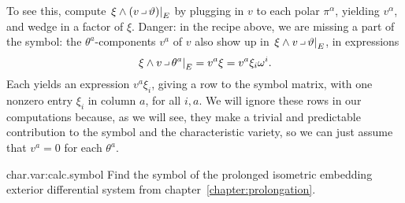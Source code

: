 To see this, compute \(\left.\xi\wedge(v\hook\vartheta)\right|_E\) by plugging in \(v\) to each polar \(\pi^{\alpha}\), yielding \(v^{\alpha}\), and wedge in a factor of \(\xi\).
Danger: in the recipe above, we are missing a part of the symbol: the \(\theta^a\)-components \(v^a\) of \(v\) also show up in \(\left.\xi\wedge v\hook\vartheta\right|_E\), in expressions 
\[
\left.\xi\wedge v\hook\theta^a\right|_E=v^a\xi=v^a\xi_i\omega^i.
\]
Each yields an expression \(v^a\xi_i\), giving a row to the symbol matrix, with one nonzero entry \(\xi_i\) in column \(a\), for all \(i,a\).
We will ignore these rows in our computations because, as we will see, they make a trivial and predictable contribution to the symbol and the characteristic variety, so we can just assume that \(v^a=0\) for each \(\theta^a\).
\begin{problem}{char.var:calc.symbol}
Find the symbol of the prolonged isometric embedding exterior differential system from chapter~\ref{chapter:prolongation}.
\end{problem}
